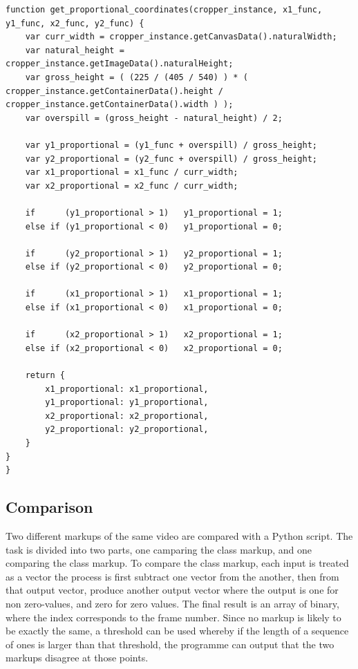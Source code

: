             \begin{lstlisting}[style=JSStyle]
function get_proportional_coordinates(cropper_instance, x1_func, y1_func, x2_func, y2_func) {
    var curr_width = cropper_instance.getCanvasData().naturalWidth;
    var natural_height = cropper_instance.getImageData().naturalHeight;
    var gross_height = ( (225 / (405 / 540) ) * ( cropper_instance.getContainerData().height / cropper_instance.getContainerData().width ) );
    var overspill = (gross_height - natural_height) / 2;

    var y1_proportional = (y1_func + overspill) / gross_height;
    var y2_proportional = (y2_func + overspill) / gross_height;
    var x1_proportional = x1_func / curr_width;
    var x2_proportional = x2_func / curr_width;

    if      (y1_proportional > 1)   y1_proportional = 1;
    else if (y1_proportional < 0)   y1_proportional = 0;

    if      (y2_proportional > 1)   y2_proportional = 1;
    else if (y2_proportional < 0)   y2_proportional = 0;

    if      (x1_proportional > 1)   x1_proportional = 1;
    else if (x1_proportional < 0)   x1_proportional = 0;

    if      (x2_proportional > 1)   x2_proportional = 1;
    else if (x2_proportional < 0)   x2_proportional = 0;

    return {
        x1_proportional: x1_proportional,
        y1_proportional: y1_proportional,
        x2_proportional: x2_proportional,
        y2_proportional: y2_proportional,
    }
}
}\end{lstlisting} 

    \subsection{Comparison}
    Two different markups of the same video are compared with a Python script. The task is divided into two parts, one camparing the class markup, and one comparing the class markup.  To compare the class markup, each input is treated as a vector the process is first subtract one vector from the another, then from that output vector, produce another output vector where the output is one for non zero-values, and zero for zero values. The final result is an array of binary, where the index corresponds to the frame number. Since no markup is likely to be exactly the same, a threshold can be used whereby if the length of a sequence of ones is larger than that threshold, the programme can output that the two markups disagree at those points.
    
